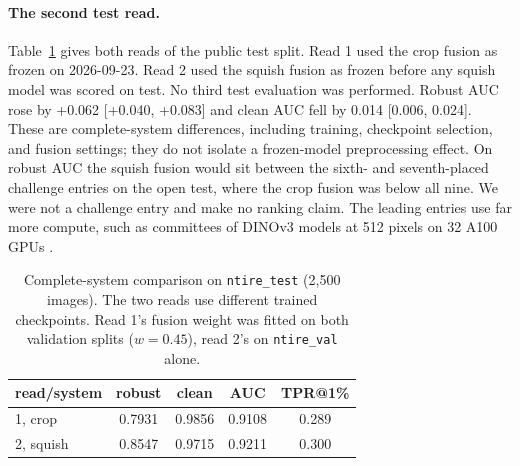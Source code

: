\documentclass[letterpaper]{article} %
\begin{document}
\paragraph{The second test read.} Table~\ref{tab:test} gives both reads of
the public test split. Read 1 used the crop fusion as frozen on 2026-09-23.
Read 2 used the squish fusion as frozen before any squish model was scored on
test. No third test evaluation was performed. Robust AUC rose by
+0.062 [+0.040, +0.083] and clean AUC fell by 0.014 [0.006, 0.024]. These are complete-system
differences, including training, checkpoint selection, and fusion settings;
they do not isolate a frozen-model preprocessing effect. On robust
AUC the squish fusion would sit between the sixth- and seventh-placed
challenge entries on the open test, where the crop fusion was below all nine.
We were not a challenge entry and make no ranking claim. The leading entries
use far more compute, such as committees of DINOv3 models at 512 pixels on 32
A100 GPUs \cite{gushchin2026ntire}.

\begin{table}[t]
\centering
\small
\begin{tabular}{lcccc}
\toprule
read/system & robust & clean & AUC & TPR@1\% \\
\midrule
1, crop & 0.7931 & 0.9856 & 0.9108 & 0.289 \\
2, squish & 0.8547 & 0.9715 & 0.9211 & 0.300 \\
\bottomrule
\end{tabular}
\caption{Complete-system comparison on \texttt{ntire\_test} (2,500 images).
The two reads use different trained checkpoints. Read 1's fusion
weight was fitted on both validation splits ($w = 0.45$), read 2's on
\texttt{ntire\_val} alone.}
\label{tab:test}
\end{table}
\end{document}
